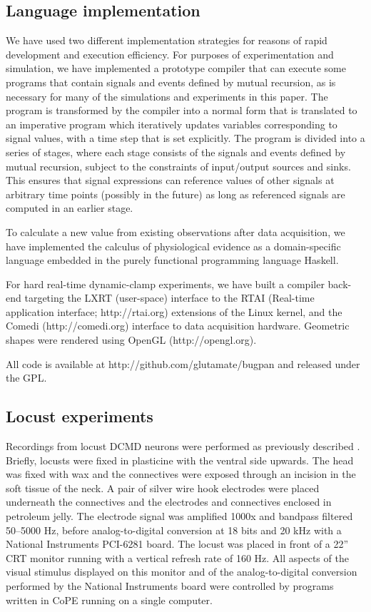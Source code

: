 \documentclass[11pt]{article}
\begin{document}
\subsection*{Language implementation} 

We have used two different implementation strategies for reasons of
rapid development and execution efficiency. For purposes of
experimentation and simulation, we have implemented a prototype
compiler that can execute some programs that contain signals and
events defined by mutual recursion, as is necessary for many of the
simulations and experiments in this paper. The program is transformed
by the compiler into a normal form that is translated to an imperative
program which iteratively updates variables corresponding to signal
values, with a time step that is set explicitly. The program is
divided into a series of stages, where each stage consists of the
signals and events defined by mutual recursion, subject to the
constraints of input/output sources and sinks. This ensures that
signal expressions can reference values of other signals at arbitrary
time points (possibly in the future) as long as referenced signals are
computed in an earlier stage.

To calculate a new value from existing observations after data
acquisition, we have implemented the calculus of physiological
evidence as a domain-specific language embedded in the purely functional
programming language Haskell. 

For hard real-time dynamic-clamp experiments, we have built a compiler
back-end targeting the LXRT (user-space) interface to the RTAI (Real-time
application interface; http://rtai.org) extensions of the Linux
kernel, and the Comedi (http://comedi.org) interface to data
acquisition hardware. Geometric shapes were rendered using OpenGL
(http://opengl.org).

All code is available at http://github.com/glutamate/bugpan and
released under the GPL.

\subsection*{Locust experiments}

Recordings from locust DCMD neurons were performed as previously
described \cite{Matheson2004}. Briefly, locusts were fixed in
plasticine with the ventral side upwards. The head was fixed with wax
and the connectives were exposed through an
incision in the soft tissue of the neck. A pair of silver wire hook
electrodes were placed underneath the connectives and the electrodes
and connectives enclosed in petroleum jelly. The electrode signal was
amplified 1000x and bandpass filtered 50--5000 Hz, before
analog-to-digital conversion at 18 bits and 20 kHz with a National
Instruments PCI-6281 board. The locust was placed in front of a 22''
CRT monitor running with a vertical refresh rate of 160 Hz. All
aspects of the visual stimulus displayed on this monitor and of
the analog-to-digital conversion performed by the National Instruments
board were controlled by programs written in 
CoPE running on a single computer.
\end{document}
